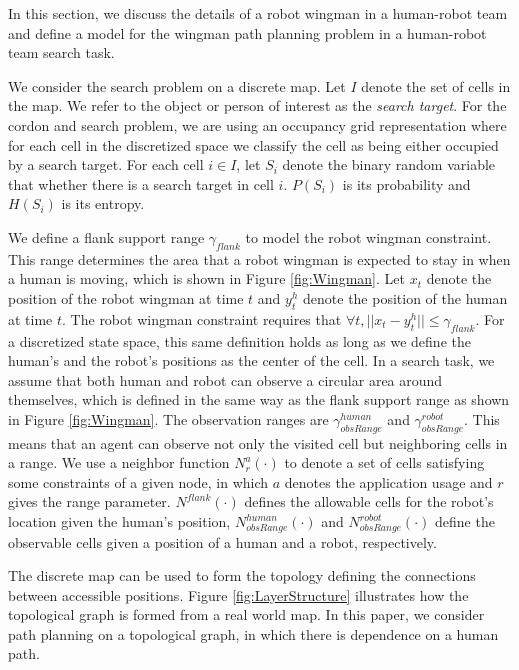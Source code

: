 \documentclass[12pt]{article}
\begin{document}
In this section, we discuss the details of a robot wingman in a human-robot team and define a model for the wingman path planning problem in a human-robot team search task.

We consider the search problem on a discrete map.
Let $ I $ denote the set of cells in the map.
We refer to the object or person of interest as the \emph{search target}.
For the cordon and search problem, we are using an occupancy grid representation where for each cell in the discretized space we classify the cell as being either occupied by a search target.
For each cell $ i \in I $, let $ S_{i} $ denote the binary random variable that whether there is a search target in cell $ i $.
$ P(S_{i}) $ is its probability and $ H(S_{i}) $ is its entropy.

We define a flank support range $ \gamma_{flank} $ to model the robot wingman constraint. 
This range determines the area that a robot wingman is expected to stay in when a human is moving, which is shown in Figure \ref{fig:Wingman}.
Let $ x_{t} $ denote the position of the robot wingman at time $ t $ and $ y^{h}_{t} $ denote the position of the human at time $ t $.
The robot wingman constraint requires that $ \forall t, || x_{t} - y^{h}_{t} || \leq \gamma_{flank} $.
For a discretized state space, this same definition holds as long as we define the human's and the robot's positions as the center of the cell.
In a search task, we assume that both human and robot can observe a circular area around themselves, which is defined in the same way as the flank support range as shown in Figure \ref{fig:Wingman}.
The observation ranges are $ \gamma^{human}_{obsRange} $ and $ \gamma^{robot}_{obsRange} $.
This means that an agent can observe not only the visited cell but neighboring cells in a range.
We use a neighbor function $ N^{a}_{r}(\cdot) $ to denote a set of cells satisfying some constraints of a given node, in which $ a $ denotes the application usage and $ r $ gives the range parameter.
$ N^{flank}(\cdot) $ defines the allowable cells for the robot's location given the human's position, $ N^{human}_{obsRange}(\cdot) $ and $ N^{robot}_{obsRange}(\cdot) $ define the observable cells given a position of a human and a robot, respectively.

The discrete map can be used to form the topology defining the connections between accessible positions.
Figure \ref{fig:LayerStructure} illustrates how the topological graph is formed from a real world map.
In this paper, we consider path planning on a topological graph, in which there is dependence on a human path.
\end{document}

